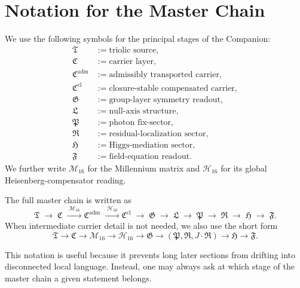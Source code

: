 \section{Notation for the Master Chain}
\label{app:master-chain-notation}

\begin{definition}
We use the following symbols for the principal stages of the Companion:
\begin{align*}
\mathfrak T &:= \text{triolic source},\\
\mathfrak C &:= \text{carrier layer},\\
\mathfrak C^{\mathrm{adm}} &:= \text{admissibly transported carrier},\\
\mathfrak C^{\mathrm{cl}} &:= \text{closure-stable compensated carrier},\\
\mathfrak G &:= \text{group-layer symmetry readout},\\
\mathfrak L &:= \text{null-axis structure},\\
\mathfrak P &:= \text{photon fix-sector},\\
\mathfrak R &:= \text{residual-localization sector},\\
\mathfrak H &:= \text{Higgs-mediation sector},\\
\mathfrak F &:= \text{field-equation readout}.
\end{align*}
We further write $\mathcal M_{16}$ for the Millennium matrix and
$\mathcal H_{16}$ for its global Heisenberg-compensator reading.
\end{definition}

\begin{definition}
The full master chain is written as
\[
\mathfrak T
\;\longrightarrow\;
\mathfrak C
\;\xrightarrow{\;\mathcal M_{16}\;}
\mathfrak C^{\mathrm{adm}}
\;\xrightarrow{\;\mathcal H_{16}\;}
\mathfrak C^{\mathrm{cl}}
\;\longrightarrow\;
\mathfrak G
\;\longrightarrow\;
\mathfrak L
\;\longrightarrow\;
\mathfrak P
\;\longrightarrow\;
\mathfrak R
\;\longrightarrow\;
\mathfrak H
\;\longrightarrow\;
\mathfrak F.
\]
When intermediate carrier detail is not needed, we also use the short form
\[
\mathfrak T
\to
\mathfrak C
\to
\mathcal M_{16}
\to
\mathcal H_{16}
\to
\mathfrak G
\to
(\mathfrak P,\mathfrak R,J\!\cdot\!\mathfrak R)
\to
\mathfrak H
\to
\mathfrak F.
\]
\end{definition}

\begin{remark}
This notation is useful because it prevents long later sections from drifting
into disconnected local language. Instead, one may always ask at which stage
of the master chain a given statement belongs.
\end{remark}

